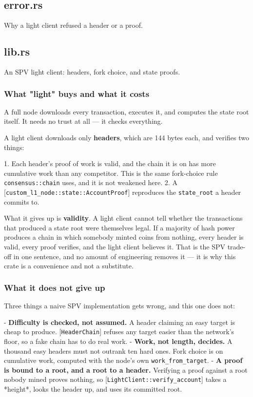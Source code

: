 \documentclass[11pt,a4paper]{article}
\begin{document}
\subsection{error.rs}
Why a light client refused a header or a proof.

\subsection{lib.rs}
An SPV light client: headers, fork choice, and state proofs.

\subsubsection{What "light" buys and what it costs}

A full node downloads every transaction, executes it, and computes the state
root itself. It needs no trust at all — it checks everything.

A light client downloads only \textbf{headers}, which are 144 bytes each, and
verifies two things:

1. Each header's proof of work is valid, and the chain it is on has more
   cumulative work than any competitor. This is the same fork-choice rule
   \texttt{consensus::chain} uses, and it is not weakened here.
2. A [\texttt{custom\_l1\_node::state::AccountProof}] reproduces the \texttt{state\_root} a
   header commits to.

What it gives up is \textbf{validity}. A light client cannot tell whether the
transactions that produced a state root were themselves legal. If a majority
of hash power produces a chain in which somebody minted coins from nothing,
every header is valid, every proof verifies, and the light client believes
it. That is the SPV trade-off in one sentence, and no amount of engineering
removes it — it is why this crate is a convenience and not a substitute.

\subsubsection{What it does not give up}

Three things a naive SPV implementation gets wrong, and this one does not:

- \textbf{Difficulty is checked, not assumed.} A header claiming an easy target
  is cheap to produce. [\texttt{HeaderChain}] refuses any target easier than the
  network's floor, so a fake chain has to do real work.
- \textbf{Work, not length, decides.} A thousand easy headers must not outrank ten
  hard ones. Fork choice is on cumulative work, computed with the node's own
  \texttt{work\_from\_target}.
- \textbf{A proof is bound to a root, and a root to a header.} Verifying a proof
  against a root nobody mined proves nothing, so [\texttt{LightClient::verify\_account}]
  takes a *height*, looks the header up, and uses its committed root.
\end{document}

